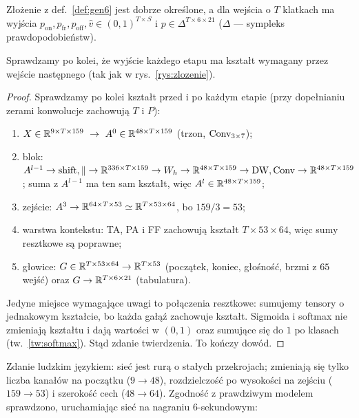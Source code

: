 \begin{twierdzenie}\label{tw:wymiary}
Złożenie z def.~\ref{def:gen6} jest dobrze określone, a dla wejścia o $T$ klatkach ma wyjścia $p_\mathrm{on},p_\mathrm{fr},p_\mathrm{off},\hat v\in(0,1)^{T\times S}$ i $p\in\Delta^{T\times6\times21}$ ($\Delta$ --- sympleks prawdopodobieństw).
\end{twierdzenie}
\begin{pomyslDowodu}
Sprawdzamy po kolei, że wyjście każdego etapu ma kształt wymagany przez wejście następnego (tak jak w rys.~\ref{rys:zlozenie}).
\end{pomyslDowodu}
\begin{proof}
Sprawdzamy po kolei kształt przed i po każdym etapie (przy dopełnianiu zerami konwolucje zachowują $T$ i $P$):
\begin{enumerate}
\item $X\in\R^{9\times T\times159}\ \to\ A^0\in\R^{48\times T\times159}$ (trzon, $\operatorname{Conv}_{3\times7}$);
\item blok: $A^{l-1}\to\operatorname{shift},\Vert\to\mathbb{R}^{336\times T\times159}\to W_h\to\mathbb{R}^{48\times T\times159}\to\operatorname{DW},\operatorname{Conv}\to\mathbb{R}^{48\times T\times159}$; suma z $A^{l-1}$ ma ten sam kształt, więc $A^l\in\mathbb{R}^{48\times T\times159}$;
\item zejście: $A^3\to\mathbb{R}^{64\times T\times53}\simeq\mathbb{R}^{T\times53\times64}$, bo $159/3=53$;
\item warstwa kontekstu: TA, PA i FF zachowują kształt $T\times53\times64$, więc sumy resztkowe są poprawne;
\item głowice: $G\in\mathbb{R}^{T\times53\times64}\to\mathbb{R}^{T\times53}$ (początek, koniec, głośność, brzmi z $65$ wejść) oraz $G\to\mathbb{R}^{T\times6\times21}$ (tabulatura).
\end{enumerate}
Jedyne miejsce wymagające uwagi to połączenia resztkowe: sumujemy tensory o jednakowym kształcie, bo każda gałąź zachowuje kształt. Sigmoida i softmax nie zmieniają kształtu i dają wartości w $(0,1)$ oraz sumujące się do $1$ po klasach (tw.~\ref{tw:softmax}).
Stąd zdanie twierdzenia. To kończy dowód.
\end{proof}

Zdanie ludzkim językiem: sieć jest rurą o stałych przekrojach; zmieniają się tylko liczba kanałów na początku ($9\to48$), rozdzielczość po wysokości na zejściu ($159\to53$) i szerokość cech ($48\to64$). Zgodność z prawdziwym modelem sprawdzono, uruchamiając sieć na nagraniu $6$-sekundowym:

